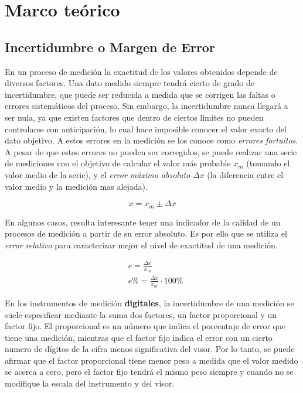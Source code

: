 \newpage
\section{Marco teórico}

\subsection{Incertidumbre o Margen de Error}

En un proceso de medición la exactitud de los valores obtenidos depende de diversos factores. Una dato medido siempre tendrá cierto de grado de incertidumbre, que puede ser reducida a medida que se corrigen las faltas o errores sistemáticos del proceso. Sin embargo, la incertidumbre nunca llegará a ser nula, ya que existen factores que dentro de ciertos límites no pueden controlarse con anticipación, lo cual hace imposible conocer el valor exacto del dato objetivo. A estos errores en la medición se los conoce como \textit{errores fortuitos}. A pesar de que estos errores no pueden ser corregidos, se puede realizar una serie de mediciones con el objetivo de calcular el valor más probable $x_m$ (tomando el valor medio de la serie), y el \textit{error máximo absoluto} $\Delta x$ (la diferencia entre el valor medio y la medición mas alejada).

\begin{equation}
    x = x_m \pm \Delta x
\end{equation}

En algunos casos, resulta interesante tener una indicador de la calidad de un procesos de medición a partir de su error absoluto. Es por ello que se utiliza el \textit{error relativo} para caracterizar mejor el nivel de exactitud de una medición.

\begin{equation}
\begin{aligned}
    & e = \frac{\Delta x}{x_m}\\
    & e\% = \frac{\Delta x}{x_m} \cdot 100\%
\end{aligned}
\end{equation}

En los instrumentos de medición \textbf{digitales}, la incertidumbre de una medición se suele especificar mediante la suma dos factores, un factor proporcional y un factor fijo. El proporcional es un número que indica el porcentaje de error que tiene una medición, mientras que el factor fijo indica el error con un cierto numero de dígitos de la cifra menos significativa del visor. Por lo tanto, se puede afirmar que el factor proporcional tiene menor peso a medida que el valor medido se acerca a cero, pero el factor fijo tendrá el mismo peso siempre y cuando no se modifique la escala del instrumento y del visor.


